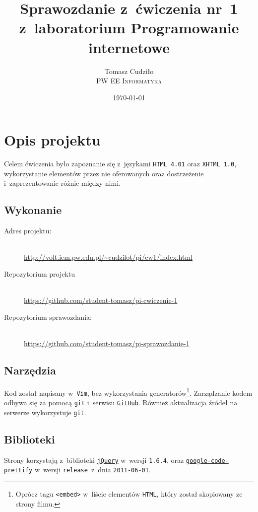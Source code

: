 \documentclass[10pt,a4paper]{article}
\newcommand{\f}[1]{\texttt{#1}}
\begin{document}
\title{
  Sprawozdanie z~ćwiczenia nr~1\\z~laboratorium Programowanie internetowe
}
\author{
  Tomasz Cudziło\\
  \textsc{PW EE Informatyka}\\[10pt]
}
\date{\today}
\maketitle



\section{Opis projektu}

Celem ćwiczenia było zapoznanie się z~językami \f{HTML 4.01} oraz \f{XHTML 1.0},
wykorzystanie elementów przez nie oferowanych oraz dostrzeżenie
i~zaprezentowanie różnic między nimi.

\subsection{Wykonanie}
\begin{description}
  \item[Adres projektu:] \hfill \\
  \url{http://volt.iem.pw.edu.pl/~cudzilot/pi/cw1/index.html}
  \item[Repozytorium projektu] \hfill \\
  \url{https://github.com/student-tomasz/pi-cwiczenie-1}
  \item[Repozytorium sprawozdania:] \hfill \\
  \url{https://github.com/student-tomasz/pi-sprawozdanie-1}
\end{description}

\subsection{Narzędzia}
Kod został napisany w~\f{Vim}, bez wykorzystania generatorów\footnote{Oprócz
tagu \f{<embed>} w~liście elementów \f{HTML}, który został skopiowany ze strony
filmu.}. Zarządzanie kodem odbywa się za pomocą \f{git} i~serwisu
\f{\href{https://github.com/}{GitHub}}. Również aktualizacja źródeł na serwerze
wykorzystuje \f{git}.

\subsection{Biblioteki}
Strony korzystają z~biblioteki \f{\href{http://jquery.com/}{jQuery}} w~wersji
\f{1.6.4}, oraz
\f{\href{http://code.google.com/p/google-code-prettify/}{google-code-prettify}}
w~wersji \f{release}~z~dnia \f{2011-06-01}.
\end{document}
